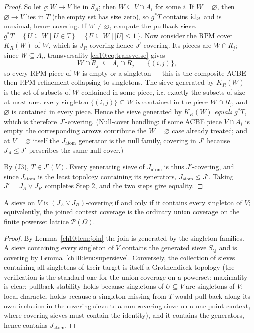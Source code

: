 \begin{proof}
So let $g : W \to V$ lie in $S_A$; then $W \subseteq V \cap A_i$ for some
$i$. If $W = \varnothing$, then $\varnothing \to V$ lies in $T$ (the empty
set has size zero), so $g^{*}T$ contains $\mathrm{id}_\varnothing$ and is maximal,
hence covering. If $W \neq \varnothing$, compute the pullback sieve:
$g^{*}T = \{\, U \subseteq W \mid U \in T \,\} = \{\, U \subseteq W \mid
|U| \le 1 \,\}$. Now consider the RPM cover $K_R(W)$ of $W$, which is
$J_R$-covering hence $J'$-covering. Its pieces are $W \cap R_j$; since
$W \subseteq A_i$, transversality \eqref{ch10:eq:transverse} gives
\[
W \cap R_j \;\subseteq\; A_i \cap R_j \;=\; \{(i, j)\},
\]
so every RPM piece of $W$ is empty or a singleton --- this is the composite
ACBE-then-RPM refinement collapsing to singletons. The sieve generated by
$K_R(W)$ is the set of subsets of $W$ contained in some piece, i.e. exactly
the subsets of size at most one: every singleton $\{(i, j)\} \subseteq W$ is
contained in the piece $W \cap R_j$, and $\varnothing$ is contained in every
piece. Hence the sieve generated by $K_R(W)$ \emph{equals} $g^{*}T$, which is
therefore $J'$-covering. (Null-cover handling: if some ACBE piece
$V \cap A_i$ is empty, the corresponding arrows contribute the
$W = \varnothing$ case already treated; and at $V = \varnothing$ itself the
$J_{\mathrm{atom}}$ generator is the null family, covering in $J'$ because
$J_A \le J'$ prescribes the same null cover.)

By (J3), $T \in J'(V)$. Every generating sieve of $J_{\mathrm{atom}}$ is thus
$J'$-covering, and since $J_{\mathrm{atom}}$ is the least topology containing
its generators, $J_{\mathrm{atom}} \le J'$. Taking $J' = J_A \vee J_R$
completes Step 2, and the two steps give equality.
\end{proof}

\begin{corollary}
\label{ch10:cor:union}
A sieve on $V$ is $(J_A \vee J_R)$-covering if and only if it contains every
singleton of $V$; equivalently, the joined context coverage is the ordinary
union coverage on the finite powerset lattice $\mathcal{P}(\Omega)$.
\end{corollary}

\begin{proof}
By Lemma~\ref{ch10:lem:join} the join is generated by the singleton families.
A sieve containing every singleton of $V$ contains the generated sieve $S_Q$
and is covering by Lemma~\ref{ch10:lem:supersieve}. Conversely, the
collection of sieves containing all singletons of their target is itself a
Grothendieck topology (the verification is the standard one for the union
coverage on a powerset: maximality is clear; pullback stability holds because
singletons of $U \subseteq V$ are singletons of $V$; local character holds
because a singleton missing from $T$ would pull back along its own inclusion
in the covering sieve to a non-covering sieve on a one-point context, where
covering sieves must contain the identity), and it contains the generators,
hence contains $J_{\mathrm{atom}}$.
\end{proof}

